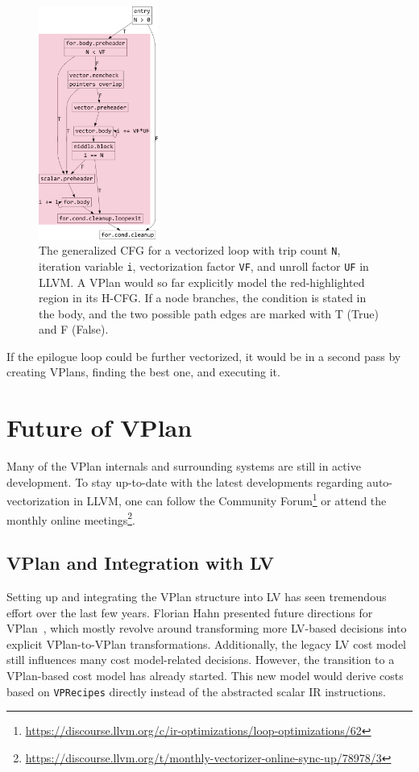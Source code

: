 \documentclass[sigplan,11pt,nonacm]{acmart}
\begin{document}
\begin{figure}
  \centering
  \includegraphics[width=0.35\textwidth]{images/inner-loop-vec-loop-cfg-color.png}
  \caption{The generalized CFG for a vectorized loop with trip count \texttt{N}, 
  iteration variable \texttt{i}, vectorization factor \texttt{VF}, 
  and unroll factor \texttt{UF} in LLVM. A VPlan would so far explicitly model the red-highlighted 
  region in its H-CFG. If a node branches, the condition is stated in the body, and the two possible 
  path edges are marked with T (True) and F (False).}
  \label{fig:inner-loop-vec-cfg}
\end{figure}

If the epilogue loop could be further vectorized, it would be in a second pass by creating VPlans, 
finding the best one, and executing it.

\section{Future of VPlan}
Many of the VPlan internals and surrounding systems are still in active development. To stay up-to-date 
with the latest developments regarding auto-vectorization in LLVM, one can follow the 
Community Forum\footnote{\url{https://discourse.llvm.org/c/ir-optimizations/loop-optimizations/62}} or
attend the monthly online 
meetings\footnote{\url{https://discourse.llvm.org/t/monthly-vectorizer-online-sync-up/78978/3}}.

\subsection{VPlan and Integration with LV}
Setting up and integrating the VPlan structure into LV has seen tremendous effort over the last 
few years. Florian Hahn presented future directions for 
VPlan~\cite{llvmvplanupdate}, which mostly revolve around transforming more LV-based decisions into
explicit VPlan-to-VPlan transformations. Additionally, the legacy LV cost model still influences 
many cost model-related decisions. However, the transition to a VPlan-based cost model has already 
started. This new model would derive costs based on \texttt{VPRecipes} directly instead of the 
abstracted scalar IR instructions.
\end{document}
